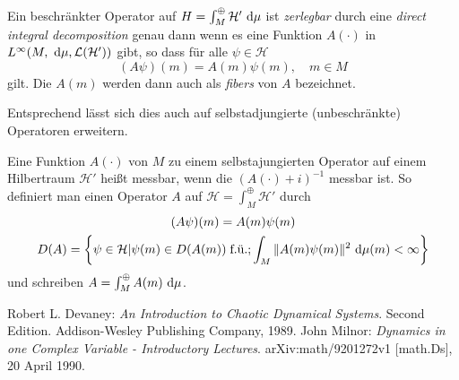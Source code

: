 \documentclass{mywork}
\begin{document}
\begin{df}
Ein beschränkter Operator auf $H= \int_M^\oplus \mathcal H'\, \dx[\mu]$ ist \emph{zerlegbar} durch eine \emph{direct integral decomposition} genau dann wenn es eine Funktion $A(\cdot)$ in $L^\infty(M, \, \dx[\mu], \mathcal L(\mathcal H'))$ gibt, so dass für alle $\psi \in \mathcal H$
$$
(A\psi)(m)=A(m) \psi(m), \quad m\in M
$$
gilt. Die $A(m)$ werden dann auch als \emph{fibers} von $A$ bezeichnet.
\end{df}
Entsprechend lässt sich dies auch auf selbstadjungierte (unbeschränkte) Operatoren erweitern.
\begin{df}
Eine Funktion $A(\cdot)$ von $M$ zu einem selbstajungierten Operator auf einem Hilbertraum $\mathcal H'$ heißt messbar, wenn die $(A(\cdot)+i)^{-1}$ messbar ist. So definiert man einen Operator $A$ auf $\mathcal H=\int_{M}^\oplus \mathcal H'$ durch
\begin{gather*}
(A\psi)(m)=A(m) \psi(m)\\
D(A)=\left \{\psi \in \mathcal H| \psi(m) \in D(A(m))\; \text{f.ü.}; \int_M \| A(m)\psi(m)\|^2 \, \dx[\mu](m) < \infty \right \}
\end{gather*}
und schreiben $A= \int_M^\oplus A(m) \, \dx[\mu]$.
\end{df}
\begin{thebibliography}{tief}
 Robert L. Devaney: {\it An Introduction to Chaotic Dynamical Systems}. Second Edition.
                     Addison-Wesley Publishing Company, 1989.
 John Milnor: {\it Dynamics in one Complex Variable - Introductory Lectures}.  arXiv:math/9201272v1 [math.Ds], 20 April 1990.
\end{thebibliography} 
\end{document}
